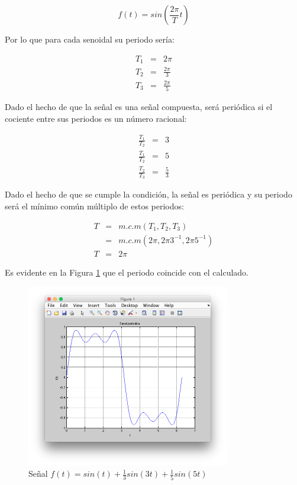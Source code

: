 \documentclass[twocolumn]{article}
\begin{document}
$$f(t) = sin\left(\frac{2\pi}{T}t\right)$$

Por lo que para cada senoidal su periodo sería:

\begin{eqnarray*}
T_1 &=& 2\pi\\
T_2 &=& \frac{2\pi}{3}\\
T_3 &=& \frac{2\pi}{5}
\end{eqnarray*}

Dado el hecho de que la señal es una señal compuesta, será periódica si el cociente entre sus periodos es un número racional:

\begin{eqnarray*}
\frac{T_1}{T_2} &=& 3\\
\frac{T_1}{T_2} &=& 5\\
\frac{T_2}{T_3} &=& \frac{5}{3}
\end{eqnarray*}

Dado el hecho de que se cumple la condición, la señal es periódica y su periodo será el mínimo común múltiplo de estos periodos:

\begin{eqnarray*}
T &=& m.c.m(T_1,T_2,T_3)\\
&=& m.c.m(2 \pi,2\pi3^{-1},2\pi5^{-1})\\
T &=& 2\pi
\end{eqnarray*}

Es evidente en la Figura \ref{fig_5b} que el periodo coincide con el calculado.

\begin{figure}[!t]
\centering
\includegraphics[width=3.5in]{imgs/5b.png}
\caption{Señal $f(t) = sin(t) + \frac{1}{3}sin(3t) + \frac{1}{5}sin(5t)$}
\label{fig_5b}
\end{figure}
\end{document}
